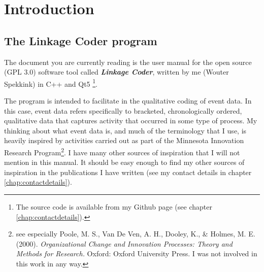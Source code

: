 \documentclass{memoir}
\begin{document}

\tableofcontents
\chapter{Introduction}
\label{chap:introduction}

\section{The Linkage Coder program}
\label{sec:eventcoderprogram}

The document you are currently reading is the user manual for the open source (GPL 3.0) software tool called \emph{\textbf{Linkage Coder}}, written by me (Wouter Spekkink) in C++ and Qt5 \footnote{The source code is available from my Github page (see chapter \ref{chap:contactdetails}).}.

The program is intended to facilitate in the qualitative coding of event data. In this case, event data refers specifically to bracketed, chronologically ordered, qualitative data that captures activity that occurred in some type of process. My thinking about what event data is, and much of the terminology that I use, is heavily inspired by activities carried out as part of the Minnesota Innovation Research Program\footnote{see especially Poole, M. S., Van De Ven, A. H., Dooley, K., \& Holmes, M. E. (2000). \emph{Organizational Change and Innovation Processes: Theory and Methods for Research.} Oxford: Oxford University Press. I was not involved in this work in any way.}. I have many other sources of inspiration that I will not mention in this manual. It should be easy enough to find my other sources of inspiration in the publications I have written (see my contact details in chapter \ref{chap:contactdetails}).
\end{document}
